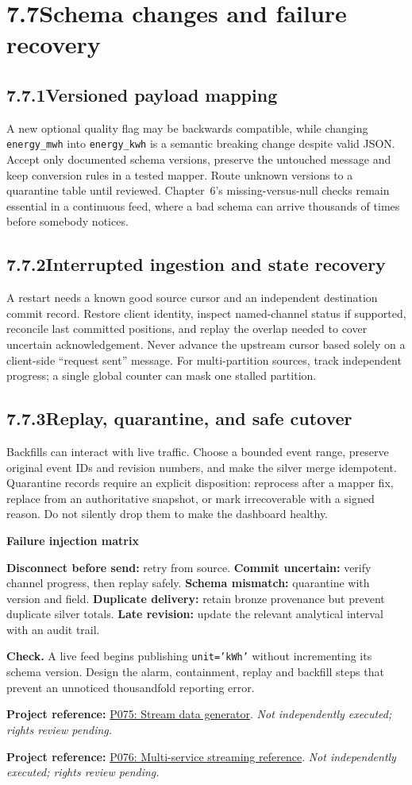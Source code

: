 \documentclass[11pt,twoside]{article}
\newcommand{\topic}[2]{\subsection*{#1\quad #2}}
\newcommand{\repo}[2]{\par\begingroup\fontsize{8.0}{9.6}\selectfont\sffamily\color{inkgray}\textbf{Project reference:} \href{#2}{#1}. \textit{Not independently executed; rights review pending.}\par\endgroup}
\begin{document}
\section*{7.7\quad Schema changes and failure recovery}
\topic{7.7.1}{Versioned payload mapping}
A new optional quality flag may be backwards compatible, while changing \texttt{energy\_mwh} into \texttt{energy\_kwh} is a semantic breaking change despite valid JSON. Accept only documented schema versions, preserve the untouched message and keep conversion rules in a tested mapper. Route unknown versions to a quarantine table until reviewed. Chapter~6's missing-versus-null checks remain essential in a continuous feed, where a bad schema can arrive thousands of times before somebody notices.
\topic{7.7.2}{Interrupted ingestion and state recovery}
A restart needs a known good source cursor and an independent destination commit record. Restore client identity, inspect named-channel status if supported, reconcile last committed positions, and replay the overlap needed to cover uncertain acknowledgement. Never advance the upstream cursor based solely on a client-side ``request sent'' message. For multi-partition sources, track independent progress; a single global counter can mask one stalled partition.
\topic{7.7.3}{Replay, quarantine, and safe cutover}
Backfills can interact with live traffic. Choose a bounded event range, preserve original event IDs and revision numbers, and make the silver merge idempotent. Quarantine records require an explicit disposition: reprocess after a mapper fix, replace from an authoritative snapshot, or mark irrecoverable with a signed reason. Do not silently drop them to make the dashboard healthy.
\begin{whitebox}\textbf{Failure injection matrix}\par
\textbf{Disconnect before send:} retry from source. \textbf{Commit uncertain:} verify channel progress, then replay safely. \textbf{Schema mismatch:} quarantine with version and field. \textbf{Duplicate delivery:} retain bronze provenance but prevent duplicate silver totals. \textbf{Late revision:} update the relevant analytical interval with an audit trail.\end{whitebox}
\textbf{Check.} A live feed begins publishing \texttt{unit='kWh'} without incrementing its schema version. Design the alarm, containment, replay and backfill steps that prevent an unnoticed thousandfold reporting error.
\repo{P075: Stream data generator}{https://github.com/Snowflake-Labs/simstreamer}
\repo{P076: Multi-service streaming reference}{https://github.com/Murataydinunimi/Real_Time_Streaming_Kafka_Airflow_DBT_Snowflake_ELK-Stack}
\newpage
\end{document}
